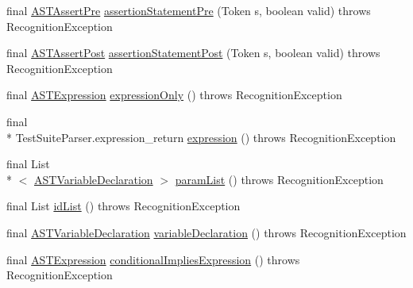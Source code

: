 \begin{DoxyCompactItemize}
\item 
final \hyperlink{classorg_1_1tzi_1_1use_1_1parser_1_1testsuite_1_1_a_s_t_assert_pre}{A\-S\-T\-Assert\-Pre} \hyperlink{classorg_1_1tzi_1_1use_1_1parser_1_1testsuite_1_1_test_suite_parser_a46b79339a581f78741a33c3869b00e27}{assertion\-Statement\-Pre} (Token s, boolean valid)  throws Recognition\-Exception 
\item 
final \hyperlink{classorg_1_1tzi_1_1use_1_1parser_1_1testsuite_1_1_a_s_t_assert_post}{A\-S\-T\-Assert\-Post} \hyperlink{classorg_1_1tzi_1_1use_1_1parser_1_1testsuite_1_1_test_suite_parser_a9b2ff4498fc2539eca6c91e4236db837}{assertion\-Statement\-Post} (Token s, boolean valid)  throws Recognition\-Exception 
\item 
final \hyperlink{classorg_1_1tzi_1_1use_1_1parser_1_1ocl_1_1_a_s_t_expression}{A\-S\-T\-Expression} \hyperlink{classorg_1_1tzi_1_1use_1_1parser_1_1testsuite_1_1_test_suite_parser_a0b50f116b8837d58d8ad8406c01e2cd8}{expression\-Only} ()  throws Recognition\-Exception 
\item 
final \\*
Test\-Suite\-Parser.\-expression\-\_\-return \hyperlink{classorg_1_1tzi_1_1use_1_1parser_1_1testsuite_1_1_test_suite_parser_aa4eb8e446e10e96cebc568c9b0735171}{expression} ()  throws Recognition\-Exception 
\item 
final List\\*
$<$ \hyperlink{classorg_1_1tzi_1_1use_1_1parser_1_1ocl_1_1_a_s_t_variable_declaration}{A\-S\-T\-Variable\-Declaration} $>$ \hyperlink{classorg_1_1tzi_1_1use_1_1parser_1_1testsuite_1_1_test_suite_parser_ad072d69435b12854232843687e589500}{param\-List} ()  throws Recognition\-Exception 
\item 
final List \hyperlink{classorg_1_1tzi_1_1use_1_1parser_1_1testsuite_1_1_test_suite_parser_a21763e87048f39bce9023a802184cbf9}{id\-List} ()  throws Recognition\-Exception 
\item 
final \hyperlink{classorg_1_1tzi_1_1use_1_1parser_1_1ocl_1_1_a_s_t_variable_declaration}{A\-S\-T\-Variable\-Declaration} \hyperlink{classorg_1_1tzi_1_1use_1_1parser_1_1testsuite_1_1_test_suite_parser_a0308d752ccefe55a58794128f00429e0}{variable\-Declaration} ()  throws Recognition\-Exception 
\item 
final \hyperlink{classorg_1_1tzi_1_1use_1_1parser_1_1ocl_1_1_a_s_t_expression}{A\-S\-T\-Expression} \hyperlink{classorg_1_1tzi_1_1use_1_1parser_1_1testsuite_1_1_test_suite_parser_a4544e74399a4ef86566850d7e0695269}{conditional\-Implies\-Expression} ()  throws Recognition\-Exception 
\item 

\end{DoxyCompactItemize}
